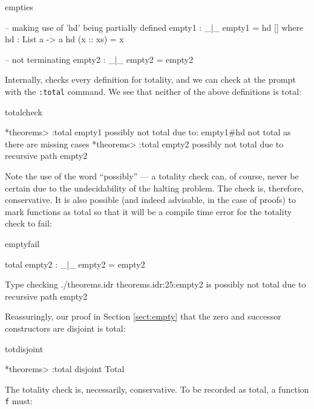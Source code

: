\begin{SaveVerbatim}{empties}

-- making use of 'hd' being partially defined
empty1 : _|_
empty1 = hd [] where
    hd : List a -> a
    hd (x :: xs) = x

-- not terminating
empty2 : _|_
empty2 = empty2

\end{SaveVerbatim}

\noindent
Internally, \Idris{} checks every definition for totality, and we can check at
the prompt with the \texttt{:total} command. We see that neither of the above
definitions is total:

\begin{SaveVerbatim}{totalcheck}

*theorems> :total empty1
possibly not total due to: empty1#hd
	not total as there are missing cases
*theorems> :total empty2
possibly not total due to recursive path empty2

\end{SaveVerbatim}

\noindent
Note the use of the word ``possibly'' --- a totality check can, of course,
never be certain due to the undecidability of the halting problem. The check
is, therefore, conservative.  It is also possible (and indeed advisable, in the
case of proofs) to mark functions as total so that it will be a compile time
error for the totality check to fail:

\begin{SaveVerbatim}{emptyfail}

total empty2 : _|_
empty2 = empty2

Type checking ./theorems.idr
theorems.idr:25:empty2 is possibly not total due to recursive path empty2 

\end{SaveVerbatim}

\noindent
Reassuringly, our proof in Section \ref{sect:empty} that the zero and successor constructors
are disjoint is total:

\begin{SaveVerbatim}{totdisjoint}

*theorems> :total disjoint
Total

\end{SaveVerbatim}

\noindent
The totality check is, necessarily, conservative. To be recorded as total, a
function \texttt{f} must:

